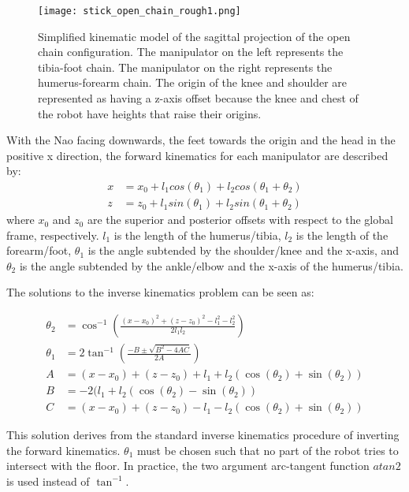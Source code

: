 \begin{figure}
	\centering
	\texttt{[image: stick\_open\_chain\_rough1.png]}
	\caption
	{Simplified kinematic model of the sagittal projection of the open chain configuration.
	The manipulator on the left represents the tibia-foot chain. The manipulator on the right
	represents the humerus-forearm chain. The origin of the knee and shoulder are represented as 
	having a z-axis offset because the knee and chest of the robot have heights that raise their 
	origins.}
	\label{fig:open_chain1}
\end{figure}

With the Nao facing downwards, the feet towards the origin and the head in the positive x direction, 
the forward kinematics for each manipulator are described by:
\begin{align}
	x &= x_0 + l_1 cos(\theta_1) + l_2 cos(\theta_1 + \theta_2) \\
	z &= z_0 + l_1 sin(\theta_1) + l_2 sin(\theta_1 + \theta_2)
\end{align}
where $x_0$ and $z_0$ are the superior and posterior offsets with respect to the global frame, respectively. $l_1$ is the length of the
humerus/tibia, $l_2$ is the length of the forearm/foot, $\theta_1$ is the angle subtended by the 
shoulder/knee and the x-axis, and $\theta_2$ is the angle subtended by the ankle/elbow and the x-axis of the humerus/tibia.

The solutions to the inverse kinematics problem can be seen as:

\begin{align}
	\theta_2 &= \cos^{-1} \left (\frac{(x - x_0)^2 + (z - z_0)^2 - l_1^2 - l_2^2}{2 l_1 l_2} \right ) \label{eq:open_fk_eq1}\\
	\theta_1 &= 2 \tan^{-1} \left (\frac{-B \pm \sqrt{B^2 - 4AC}}{2A} \right ) \label{eq:open_fk_eq2}\\
	A &= (x - x_0) + (z - z_0) + l_1 + l_2 (\cos(\theta_2) + \sin(\theta_2)) \\
	B &= -2(l_1 + l_2(\cos(\theta_2) - \sin(\theta_2)) \\
	C &= (x - x_0) + (z - z_0) - l_1 - l_2 (\cos(\theta_2) + \sin(\theta_2))
\end{align}

This solution derives from the standard inverse kinematics procedure of inverting the forward kinematics.
$\theta_1$ must be chosen such that no part of the robot tries to intersect with the floor. 
In practice, the two argument arc-tangent function $atan2$ is used instead of $\tan^{-1}$.

